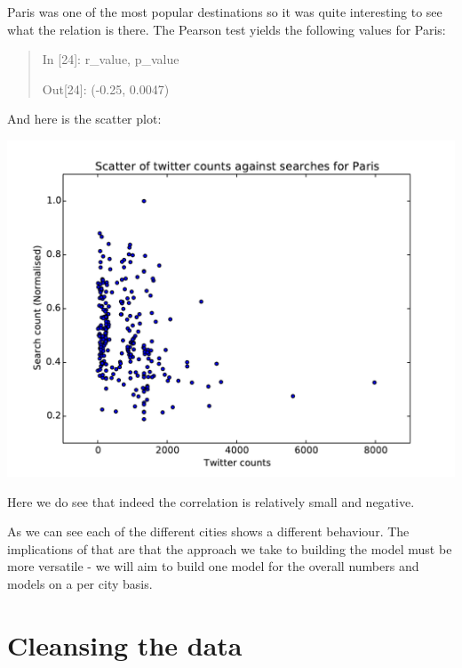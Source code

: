\documentclass[minf,frontabs,twoside,singlespacing,parskip]{infthesis}
\begin{document}

Paris was one of the most popular destinations so it was quite interesting to see what the relation is there. The Pearson test yields the following values for Paris:
\begin{quotation}
In [24]: r\_value, p\_value

Out[24]: (-0.25, 0.0047)
\end{quotation}
\newpage
And here is the scatter plot:

\includegraphics[width=\textwidth]{Paris}

Here we do see that indeed the correlation is relatively small and negative. 

As we can see each of the different cities shows a different behaviour. The implications of that are that the approach we take to building the model must be more versatile - we will aim to build one model for the overall numbers and models on a per city basis.

\section{Cleansing the data}
\end{document}
